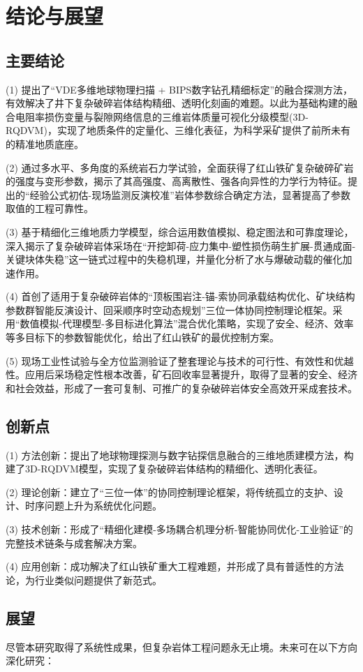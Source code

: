 \documentclass[twocolumn,a4paper,10pt]{article}
\begin{document}
\section{结论与展望}
\subsection{主要结论}
(1) 提出了“VDE多维地球物理扫描 + BIPS数字钻孔精细标定”的融合探测方法，有效解决了井下复杂破碎岩体结构精细、透明化刻画的难题。以此为基础构建的融合电阻率损伤变量与裂隙网络信息的三维岩体质量可视化分级模型(3D-RQDVM)，实现了地质条件的定量化、三维化表征，为科学采矿提供了前所未有的精准地质底座。

(2) 通过多水平、多角度的系统岩石力学试验，全面获得了红山铁矿复杂破碎矿岩的强度与变形参数，揭示了其高强度、高离散性、强各向异性的力学行为特征。提出的“经验公式初估-现场监测反演校准”岩体参数综合确定方法，显著提高了参数取值的工程可靠性。

(3) 基于精细化三维地质力学模型，综合运用数值模拟、稳定图法和可靠度理论，深入揭示了复杂破碎岩体采场在“开挖卸荷-应力集中-塑性损伤萌生扩展-贯通成面-关键块体失稳”这一链式过程中的失稳机理，并量化分析了水与爆破动载的催化加速作用。

(4) 首创了适用于复杂破碎岩体的“顶板围岩注-锚-索协同承载结构优化、矿块结构参数群智能反演设计、回采顺序时空动态规划”三位一体协同控制理论框架。采用“数值模拟-代理模型-多目标进化算法”混合优化策略，实现了安全、经济、效率等多目标下的参数智能优化，给出了红山铁矿的最优控制方案。

(5) 现场工业性试验与全方位监测验证了整套理论与技术的可行性、有效性和优越性。应用后采场稳定性根本改善，矿石回收率显著提升，取得了显著的安全、经济和社会效益，形成了一套可复制、可推广的复杂破碎岩体安全高效开采成套技术。

\subsection{创新点}
(1) 方法创新：提出了地球物理探测与数字钻探信息融合的三维地质建模方法，构建了3D-RQDVM模型，实现了复杂破碎岩体结构的精细化、透明化表征。

(2) 理论创新：建立了“三位一体”的协同控制理论框架，将传统孤立的支护、设计、时序问题上升为系统优化问题。

(3) 技术创新：形成了“精细化建模-多场耦合机理分析-智能协同优化-工业验证”的完整技术链条与成套解决方案。

(4) 应用创新：成功解决了红山铁矿重大工程难题，并形成了具有普适性的方法论，为行业类似问题提供了新范式。

\subsection{展望}
尽管本研究取得了系统性成果，但复杂岩体工程问题永无止境。未来可在以下方向深化研究：
\end{document}
